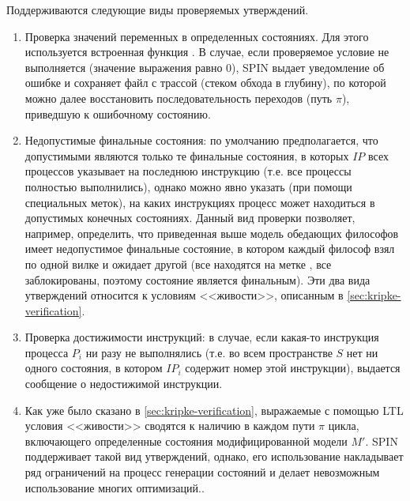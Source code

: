 Поддерживаются следующие виды проверяемых утверждений. 

\begin{enumerate}
\item Проверка значений переменных в определенных состояниях. Для этого используется
  встроенная функция . В случае, если проверяемое условие не выполняется
  (значение выражения равно 0), SPIN выдает уведомление об ошибке и сохраняет файл с
  трассой (стеком обхода в глубину), по которой можно далее восстановить
  последовательность переходов (путь $\pi$), приведшую к ошибочному состоянию.

\item Недопустимые финальные состояния: по умолчанию предполагается, что допустимыми
  являются только те финальные состояния, в которых $IP$ всех процессов указывает на
  последнюю инструкцию (т.е. все процессы полностью выполнились), однако можно явно
  указать (при помощи специальных меток), на каких инструкциях процесс может находиться в
  допустимых конечных состояниях. Данный вид проверки позволяет, например, определить, что
  приведенная выше модель обедающих философов имеет недопустимое финальные состояние, в
  котором каждый философ взял по одной вилке и ожидает другой (все находятся на метке
  , все заблокированы, поэтому состояние является финальным). Эти два вида
  утверждений относится к условиям <<живости>>, описанным в \ref{sec:kripke-verification}.

\item Проверка достижимости инструкций: в случае, если какая-то инструкция процесса $P_i$
  ни разу не выполнялись (т.е. во всем пространстве $S$ нет ни одного состояния, в котором
  $IP_i$ содержит номер этой инструкции), выдается сообщение о недостижимой инструкции.

\item Как уже было сказано в \ref{sec:kripke-verification}, выражаемые с помощью LTL
  условия <<живости>> сводятся к наличию в каждом пути $\pi$ цикла, включающего
  определенные состояния модифицированной модели $M'$. SPIN поддерживает такой вид
  утверждений, однако, его использование накладывает ряд ограничений на процесс генерации
  состояний и делает невозможным использование многих оптимизаций.\cite{SpinRoot}.
\end{enumerate}

